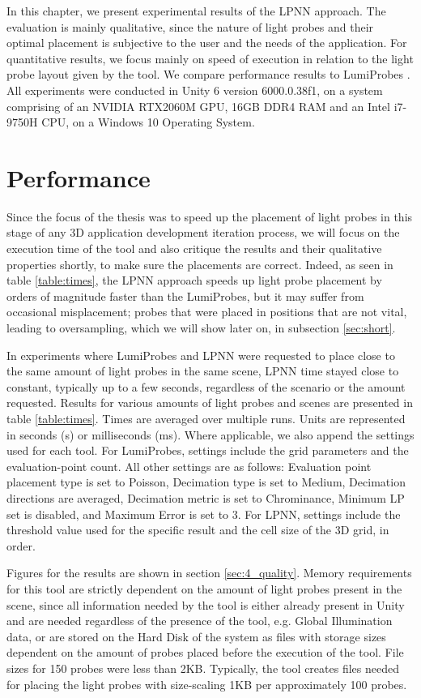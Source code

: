 In this chapter, we present experimental results of the LPNN approach. The evaluation is mainly qualitative, since the nature of light probes and their optimal placement is subjective to the user and the needs of the application. For quantitative results, we focus mainly on speed of execution in relation to the light probe layout given by the tool. We compare performance results to LumiProbes \parencite{Vardis2021}. All experiments were conducted in Unity 6 version 6000.0.38f1, on a system comprising of an NVIDIA RTX2060M GPU, 16GB DDR4 RAM and an Intel i7-9750H CPU, on a Windows 10 Operating System.

\section{Performance}
\label{sec:4_performance}
Since the focus of the thesis was to speed up the placement of light probes in this stage of any 3D application development iteration process, we will focus on the execution time of the tool and also critique the results and their qualitative properties shortly, to make sure the placements are correct. Indeed, as seen in table \ref{table:times}, the LPNN approach speeds up light probe placement by orders of magnitude faster than the LumiProbes, but it may suffer from occasional misplacement; probes that were placed in positions that are not vital, leading to oversampling, which we will show later on, in subsection \ref{sec:short}. 

In experiments where LumiProbes and LPNN were requested to place close to the same amount of light probes in the same scene, LPNN time stayed close to constant, typically up to a few seconds, regardless of the scenario or the amount requested. Results for various amounts of light probes and scenes are presented in table \ref{table:times}. Times are averaged over multiple runs. Units are represented in seconds (s) or milliseconds (ms). Where applicable, we also append the settings used for each tool. For LumiProbes, settings include the grid parameters and the evaluation-point count. All other settings are as follows: Evaluation point placement type is set to Poisson, Decimation type is set to Medium, Decimation directions are averaged, Decimation metric is set to  Chrominance, Minimum LP set is disabled, and Maximum Error is set to 3. For LPNN, settings include the threshold value used for the specific result and the cell size of the 3D grid, in order.\newline

Figures for the results are shown in section \ref{sec:4_quality}. Memory requirements for this tool are strictly dependent on the amount of light probes present in the scene, since all information needed by the tool is either already present in Unity and are needed regardless of the presence of the tool, e.g. Global Illumination data, or are stored on the Hard Disk of the system as files with storage sizes dependent on the amount of probes placed before the execution of the tool. File sizes for 150 probes were less than 2KB. Typically, the tool creates files needed for placing the light probes with size-scaling 1KB per approximately 100 probes.


